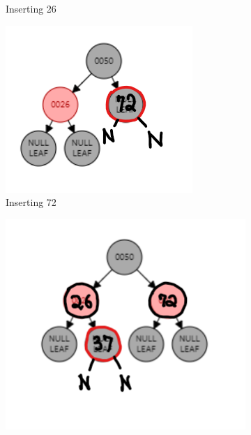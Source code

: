 \documentclass[12pt, a4paper]{article}
\begin{document}
\begin{enumerate}
\begin{figure}[h!]
\begin{subfigure}[b]{0.3\textwidth}
        \caption{Inserting 26}
        \label{fig:3-1-b}
      \end{subfigure}
      \hfill
      \begin{subfigure}[b]{0.3\textwidth}
        \centering
        \includegraphics[width=\textwidth]{3-1-c}
        \caption{Inserting 72}
        \label{fig:3-1-c}
      \end{subfigure}
      \hfill
      \begin{subfigure}[b]{0.3\textwidth}
        \centering
        \includegraphics[width=\textwidth]{3-1-d}

\end{subfigure}
\end{figure}
\end{enumerate}
\end{document}
